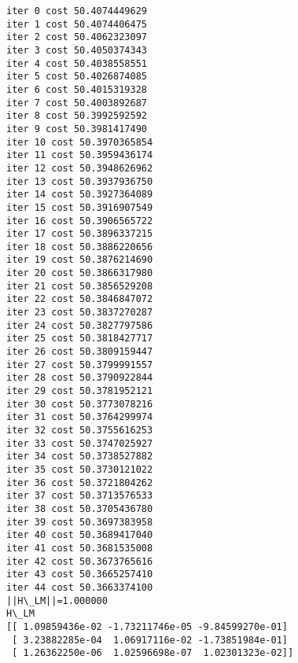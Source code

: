 \documentclass[11pt]{article}
\begin{document}
    \begin{Verbatim}[commandchars=\\\{\}]
iter 0 cost 50.4074449629
iter 1 cost 50.4074406475
iter 2 cost 50.4062323097
iter 3 cost 50.4050374343
iter 4 cost 50.4038558551
iter 5 cost 50.4026874085
iter 6 cost 50.4015319328
iter 7 cost 50.4003892687
iter 8 cost 50.3992592592
iter 9 cost 50.3981417490
iter 10 cost 50.3970365854
iter 11 cost 50.3959436174
iter 12 cost 50.3948626962
iter 13 cost 50.3937936750
iter 14 cost 50.3927364089
iter 15 cost 50.3916907549
iter 16 cost 50.3906565722
iter 17 cost 50.3896337215
iter 18 cost 50.3886220656
iter 19 cost 50.3876214690
iter 20 cost 50.3866317980
iter 21 cost 50.3856529208
iter 22 cost 50.3846847072
iter 23 cost 50.3837270287
iter 24 cost 50.3827797586
iter 25 cost 50.3818427717
iter 26 cost 50.3809159447
iter 27 cost 50.3799991557
iter 28 cost 50.3790922844
iter 29 cost 50.3781952121
iter 30 cost 50.3773078216
iter 31 cost 50.3764299974
iter 32 cost 50.3755616253
iter 33 cost 50.3747025927
iter 34 cost 50.3738527882
iter 35 cost 50.3730121022
iter 36 cost 50.3721804262
iter 37 cost 50.3713576533
iter 38 cost 50.3705436780
iter 39 cost 50.3697383958
iter 40 cost 50.3689417040
iter 41 cost 50.3681535008
iter 42 cost 50.3673765616
iter 43 cost 50.3665257410
iter 44 cost 50.3663374100
||H\_LM||=1.000000
H\_LM
[[ 1.09859436e-02 -1.73211746e-05 -9.84599270e-01]
 [ 3.23882285e-04  1.06917116e-02 -1.73851984e-01]
 [ 1.26362250e-06  1.02596698e-07  1.02301323e-02]]

    \end{Verbatim}


    
    
    
    
\end{document}
